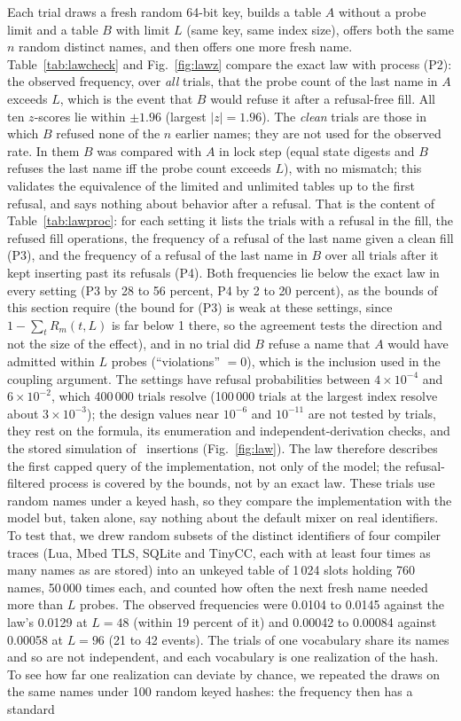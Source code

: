 Each trial draws a fresh random 64-bit key, builds a table $A$ without a probe limit and a table $B$ with limit $L$ (same key, same index size), offers both the same $n$ random distinct names, and then offers one more fresh name. Table~\ref{tab:lawcheck} and Fig.~\ref{fig:lawz} compare the exact law with process (P2): the observed frequency, over \emph{all} trials, that the probe count of the last name in $A$ exceeds $L$, which is the event that $B$ would refuse it after a refusal-free fill. All ten $z$-scores lie within $\pm1.96$ (largest $|z|=1.96$). The \emph{clean} trials are those in which $B$ refused none of the $n$ earlier names; they are not used for the observed rate. In them $B$ was compared with $A$ in lock step (equal state digests and $B$ refuses the last name iff the probe count exceeds $L$), with no mismatch; this validates the equivalence of the limited and unlimited tables up to the first refusal, and says nothing about behavior after a refusal. That is the content of Table~\ref{tab:lawproc}: for each setting it lists the trials with a refusal in the fill, the refused fill operations, the frequency of a refusal of the last name given a clean fill (P3), and the frequency of a refusal of the last name in $B$ over all trials after it kept inserting past its refusals (P4). Both frequencies lie below the exact law in every setting (P3 by 28 to 56 percent, P4 by 2 to 20 percent), as the bounds of this section require (the bound for (P3) is weak at these settings, since $1-\sum_t R_m(t,L)$ is far below 1 there, so the agreement tests the direction and not the size of the effect), and in no trial did $B$ refuse a name that $A$ would have admitted within $L$ probes (``violations'' $=0$), which is the inclusion used in the coupling argument. The settings have refusal probabilities between $4\times10^{-4}$ and $6\times10^{-2}$, which 400\,000 trials resolve (100\,000 trials at the largest index resolve about $3\times10^{-3}$); the design values near $10^{-6}$ and $10^{-11}$ are not tested by trials, they rest on the formula, its enumeration and independent-derivation checks, and the stored simulation of \ProbeTotal\ insertions (Fig.~\ref{fig:law}). The law therefore describes the first capped query of the implementation, not only of the model; the refusal-filtered process is covered by the bounds, not by an exact law. These trials use random names under a keyed hash, so they compare the implementation with the model but, taken alone, say nothing about the default mixer on real identifiers. To test that, we drew random subsets of the distinct identifiers of four compiler traces (Lua, Mbed TLS, SQLite and TinyCC, each with at least four times as many names as are stored) into an unkeyed table of 1\,024 slots holding 760 names, 50\,000 times each, and counted how often the next fresh name needed more than $L$ probes. The observed frequencies were 0.0104 to 0.0145 against the law's 0.0129 at $L=48$ (within 19 percent of it) and 0.00042 to 0.00084 against 0.00058 at $L=96$ (21 to 42 events). The trials of one vocabulary share its names and so are not independent, and each vocabulary is one realization of the hash. To see how far one realization can deviate by chance, we repeated the draws on the same names under 100 random keyed hashes: the frequency then has a standard 